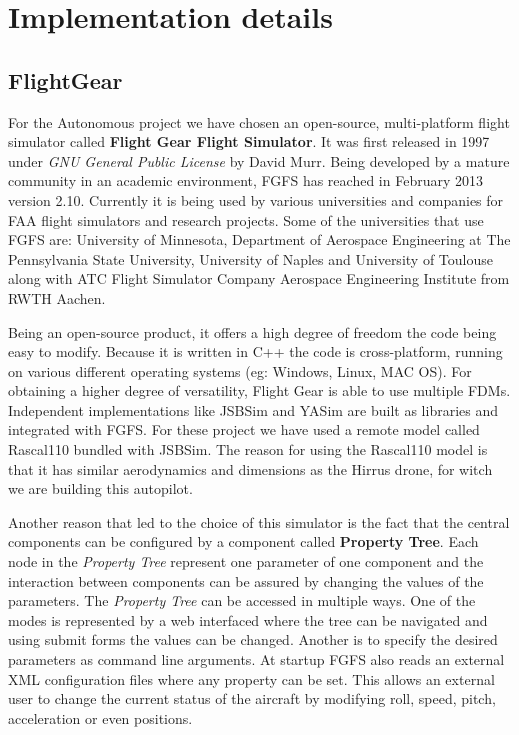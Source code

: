 \chapter{Implementation details}
\label{chapter:implementation-details}

\section{FlightGear}
\label{sec:fgfs}
For the Autonomous project we have chosen an open-source, multi-platform
flight simulator called \textbf{Flight Gear Flight Simulator}. It was first
released in 1997 under \textit{GNU General Public License} by David Murr. Being
developed by a mature community in an academic environment,  FGFS has reached in February 2013 version 2.10. Currently
it is being used by various universities and companies for FAA flight simulators
and research projects. Some of the universities that use FGFS are: University of
Minnesota, Department of Aerospace Engineering at The Pennsylvania State University,
University of Naples and University of Toulouse along with ATC Flight Simulator
Company Aerospace Engineering Institute from RWTH Aachen.


Being an open-source product, it offers a high degree of freedom the code being
easy to modify. Because it is written in C++ the code is cross-platform, running
on various different operating systems (eg: Windows, Linux, MAC OS). For
obtaining a higher degree of versatility, Flight Gear is able to use multiple
FDMs. Independent implementations like
JSBSim and YASim are built as libraries and integrated with FGFS. For these
project we have used a remote model called Rascal110 bundled with JSBSim. The
reason for using the Rascal110 model is that it has similar aerodynamics and
dimensions as the Hirrus drone, for witch we are building this autopilot.

Another reason that led to the choice of this simulator is the fact that the 
central components can be configured by a component called \textbf{Property Tree}.
Each node in the \textit{Property Tree} represent one parameter of one component
and the interaction between components can be assured by changing the values of
the parameters. The \textit{Property Tree} can be accessed in multiple ways.
One of the modes is represented by a web interfaced where the tree can be navigated
and using submit forms the values can be changed. Another is to specify the
desired parameters as command line arguments. At startup FGFS also reads an
external XML configuration files where
any property can be set. This allows an external user to change the current
status of the aircraft by modifying roll, speed, pitch, acceleration or even positions.

